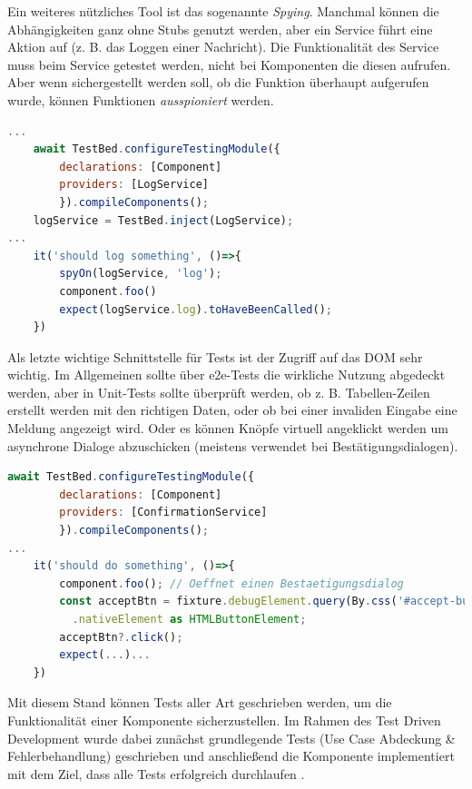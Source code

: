Ein weiteres nützliches Tool ist das sogenannte \textit{Spying}. Manchmal können  die Abhängigkeiten ganz ohne Stubs genutzt werden, aber ein Service führt eine Aktion auf (z. B. das Loggen einer Nachricht). Die Funktionalität des Service muss beim Service getestet werden, nicht bei Komponenten die diesen aufrufen. Aber wenn sichergestellt werden soll, ob die Funktion überhaupt aufgerufen wurde, können Funktionen \textit{ausspioniert} werden.

\begin{lstlisting}[language=JavaScript,caption={Dependency Spying},label=lst:spytest]
...
    await TestBed.configureTestingModule({
        declarations: [Component]
        providers: [LogService]
        }).compileComponents();
    logService = TestBed.inject(LogService);
...
    it('should log something', ()=>{
        spyOn(logService, 'log');
        component.foo()
        expect(logService.log).toHaveBeenCalled();
    })
\end{lstlisting}

Als letzte wichtige Schnittstelle für Tests ist der Zugriff auf das DOM sehr wichtig. Im Allgemeinen sollte über e2e-Tests die wirkliche Nutzung abgedeckt werden, aber in Unit-Tests sollte überprüft werden, ob z. B. Tabellen-Zeilen erstellt werden mit den richtigen Daten, oder ob bei einer invaliden Eingabe eine Meldung angezeigt wird. Oder es können Knöpfe virtuell angeklickt werden um asynchrone Dialoge abzuschicken (meistens verwendet bei Bestätigungsdialogen).

\begin{lstlisting}[language=JavaScript,caption={Zugriff auf das DOM},label=lst:domtest]
    await TestBed.configureTestingModule({
        declarations: [Component]
        providers: [ConfirmationService]
        }).compileComponents();
...
    it('should do something', ()=>{
        component.foo(); // Oeffnet einen Bestaetigungsdialog
        const acceptBtn = fixture.debugElement.query(By.css('#accept-button'))
          .nativeElement as HTMLButtonElement;
        acceptBtn?.click();
        expect(...)...
    })
\end{lstlisting}

Mit diesem Stand können Tests aller Art geschrieben werden, um die Funktionalität einer Komponente sicherzustellen. Im Rahmen des Test Driven Development wurde dabei zunächst grundlegende Tests (Use Case Abdeckung \& Fehlerbehandlung) geschrieben und anschließend die Komponente implementiert mit dem Ziel, dass alle Tests erfolgreich durchlaufen \cite{Angular.02.02.2023}.

